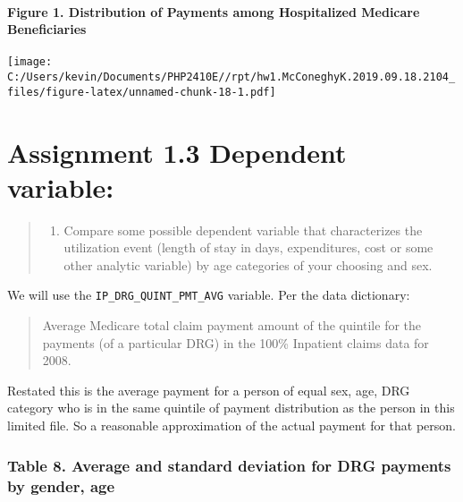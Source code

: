 \documentclass[]{article}
\providecommand{\tightlist}{%
  \setlength{\itemsep}{0pt}\setlength{\parskip}{0pt}}
\let\oldparagraph\paragraph
\renewcommand{\paragraph}[1]{\oldparagraph{#1}\mbox{}}
\begin{document}
\hypertarget{figure-1.-distribution-of-payments-among-hospitalized-medicare-beneficiaries}{%
\paragraph{Figure 1. Distribution of Payments among Hospitalized
Medicare
Beneficiaries}\label{figure-1.-distribution-of-payments-among-hospitalized-medicare-beneficiaries}}

\texttt{[image: C:/Users/kevin/Documents/PHP2410E//rpt/hw1.McConeghyK.2019.09.18.2104\_files/figure-latex/unnamed-chunk-18-1.pdf]}

\hypertarget{assignment-1.3-dependent-variable}{%
\section{Assignment 1.3 Dependent
variable:}\label{assignment-1.3-dependent-variable}}

\begin{quote}
\begin{enumerate}
\def\labelenumi{\arabic{enumi}.}
\setcounter{enumi}{2}
\tightlist
\item
  Compare some possible dependent variable that characterizes the
  utilization event (length of stay in days, expenditures, cost or some
  other analytic variable) by age categories of your choosing and sex.
\end{enumerate}
\end{quote}

We will use the \texttt{IP\_DRG\_QUINT\_PMT\_AVG} variable. Per the data
dictionary:

\begin{quote}
Average Medicare total claim payment amount of the quintile for the
payments (of a particular DRG) in the 100\% Inpatient claims data for
2008.
\end{quote}

Restated this is the average payment for a person of equal sex, age, DRG
category who is in the same quintile of payment distribution as the
person in this limited file. So a reasonable approximation of the actual
payment for that person.

\hypertarget{table-8.-average-and-standard-deviation-for-drg-payments-by-gender-age}{%
\subsubsection{Table 8. Average and standard deviation for DRG payments
by gender,
age}\label{table-8.-average-and-standard-deviation-for-drg-payments-by-gender-age}}
\end{document}
